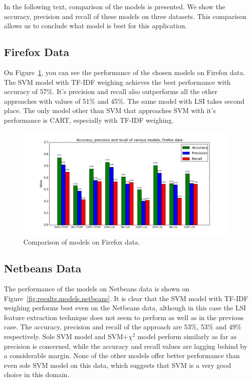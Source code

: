 In the following text, comparison of the models is presented. We show the accuracy, precision and recall of these models on three datasets. This comparison allows us to conclude what model is best for this application.

\subsection{Firefox Data}

On Figure~\ref{fig:results.models.firefox}, you can see the performance of the chosen models on Firefox data. The SVM model with TF-IDF weighing achieves the best performance with accuracy of 57\%. It's precision and recall also outperforms all the other approaches with values of 51\% and 45\%. The same model with LSI takes second place. The only model other than SVM that approaches SVM with it's performance is CART, especially with TF-IDF weighing.

\begin{figure}[htbp]
    \centering
        \includegraphics[width=\textwidth]{./images/comparison_of_models/firefox.png}
    \caption{Comparison of models on Firefox data.}
    \label{fig:results.models.firefox}
\end{figure}

\subsection{Netbeans Data}

The performance of the models on Netbeans data is shown on Figure~\ref{fig:results.models.netbeans}. It is clear that the SVM model with TF-IDF weighing performs best even on the Netbeans data, although in this case the LSI feature extraction technique does not seem to perform as well as in the previous case. The accuracy, precision and recall of the approach are 53\%, 53\% and 49\% respectively. Sole SVM model and SVM+$\chi^2$ model perform similarly as far as precision is concerned, while the accuracy and recall values are lagging behind by a considerable margin. None of the other models offer better performance than even sole SVM model on this data, which suggests that SVM is a very good choice in this domain.

